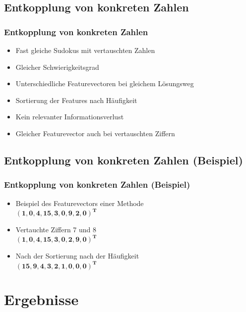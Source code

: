 \documentclass[accentcolor=tud6b,colorbacktitle,inverttitle,landscape,german,presentation,t]{tudbeamer}
\begin{document}
	\subsection{Entkopplung von konkreten Zahlen}
		\begin{frame}
		\frametitle{Entkopplung von konkreten Zahlen}
		\begin{itemize}
		\item Fast gleiche Sudokus mit vertauschten Zahlen
		\item Gleicher Schwierigkeitsgrad
		\item Unterschiedliche Featurevectoren bei gleichem Lösungsweg
		\item Sortierung der Features nach Häufigkeit
		\item Kein relevanter Informationsverlust
		\item Gleicher Featurevector auch bei vertauschten Ziffern
		\end{itemize}
		\end{frame}

	\subsection{Entkopplung von konkreten Zahlen (Beispiel)}
		\begin{frame}
		\frametitle{Entkopplung von konkreten Zahlen (Beispiel)}
		\begin{itemize}
		\item Beispiel des Featurevectors einer Methode\\$\mathbf{(1, 0, 4, 15, 3, 0, 9, 2, 0)^{T}}$
		\item Vertauchte Ziffern 7 und 8\\$\mathbf{(1, 0, 4, 15, 3, 0, 2, 9, 0)^{T}}$
		\item Nach der Sortierung nach der Häufigkeit\\$\mathbf{(15, 9, 4, 3, 2, 1, 0, 0, 0)^{T}}$
		\end{itemize}
		\end{frame}

\section{Ergebnisse}
\end{document}

